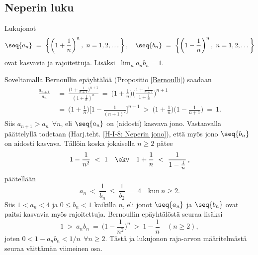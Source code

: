 \pagebreak

\subsection*{Neperin luku}
%

\begin{Prop} \label{Neperin jonot} Lukujonot 
\[
\seq{a_n}\ =\ \left\{\left(1 + \frac{1}{n}\right)^n,\ n = 1,2, \ldots\,\right\}, \quad 
\seq{b_n}\ =\ \left\{\left(1 - \frac{1}{n}\right)^n,\ n = 1,2, \ldots\,\right\} 
\]
ovat kasvavia ja rajoitettuja. Lisäksi $\ \lim_n a_n b_n = 1$. \end{Prop}
\tod Soveltamalla Bernoullin epäyhtälöä (Propositio \ref{Bernoulli}) saadaan
\begin{align*}
\frac{a_{n+1}}{a_n}\ &=\ \frac{\bigl(1 + \frac{1}{n+1}\bigr)^{n+1}}{(1 + \frac{1}{n})^n}\
                      =\ \biggl(1 + \frac{1}{n}\biggr) 
                         \Biggl( \frac{1 + \frac{1}{n+1}}{1 + \frac{1}{n}} \Biggr)^{n+1} \\
                     &=\ \biggl(1 + \frac{1}{n}\biggr) 
                         \Biggl[ 1 - \frac{1}{(n+1)^2} \Biggr]^{n+1}\ 
                      >\ \biggl(1 + \frac{1}{n}\biggr)\biggl(1 - \frac{1}{n+1}\biggr)\ =\ 1.
\end{align*}
Siis $a_{n+1} > a_n\ \ \forall n$, eli $\seq{a_n}$ on (aidosti) kasvava jono. Vastaavalla 
päättelyllä todetaan (Harj.teht. \ref{H-I-8: Neperin jono}), että myös jono $\seq{b_n}$ on 
aidosti kasvava. Tällöin koska jokaisella $n \ge 2$ pätee
\[
1 - \frac{1}{n^2}\ <\ 1 \quad \ekv \quad 1 + \frac{1}{n}\ <\ \frac{1}{1-\frac{1}{n}}\,,
\]
päätellään
\[
a_n\ <\ \frac{1}{b_n}\ \le\ \frac{1}{b_2}\ =\ 4 \quad \text{kun}\ n \ge 2.
\]
Siis $1 < a_n < 4$ ja $0 \le b_n < 1$ kaikilla $n$, eli jonot $\seq{a_n}$ ja $\seq{b_n}$ ovat
paitsi kasvavia myös rajoitettuja. Bernoullin epäyhtälöstä seuraa lisäksi
\[
1\ >\ a_n b_n\ =\ \bigl(1 - \frac{1}{n^2}\bigr)^n\ >\ 1 - \frac{1}{n} \quad (n \ge 2),
\]
joten $0 < 1 - a_n b_n < 1/n\ \ \forall n \ge 2$. Tästä ja lukujonon raja-arvon määritelmästä
seuraa väittämän viimeinen osa. \loppu  

